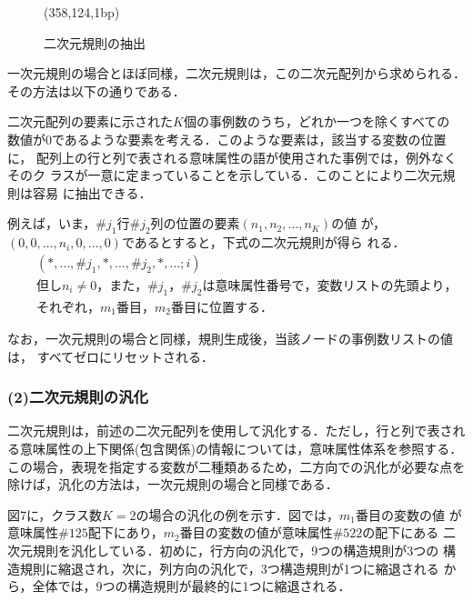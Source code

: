 \begin{figure}[thb]
\begin{center}
\begin{epsf}
\end{epsf}
\begin{draft}
\atari(358,124,1bp)
\end{draft}
\end{center}
\vspace*{-4mm}
\caption{二次元規則の抽出}
\label{fig:二次元規則の抽出}
\end{figure}

一次元規則の場合とほぼ同様，二次元規則は，この二次元配列から求められる．
その方法は以下の通りである．

二次元配列の要素に示された$K$個の事例数のうち，どれか一つを除くすべての
数値が0であるような要素を考える．このような要素は，該当する変数の位置に，
配列上の行と列で表される意味属性の語が使用された事例では，例外なくそのク
ラスが一意に定まっていることを示している．このことにより二次元規則は容易
に抽出できる．

例えば，いま，$\#{j_1}$行$\#{j_2}$列の位置の要素$({n_1,n_2,\dots,n_K})$の値
が，$(0,0,\dots,{n_i},0,\dots,0)$であるとすると，下式の二次元規則が得ら
れる．
\begin{eqnarray}
 &&{(*,\dots,\#j_1,*,\dots,\#j_2,*,\dots;i)}\\
 &&但し{n_i}\neq 0，また，{\#j_1}，{\#j_2}は意味属性番号で，変数リストの先頭より，\nonumber \\
 &&それぞれ，{m_1}番目，{m_2}番目に位置する．\nonumber
\end{eqnarray}

なお，一次元規則の場合と同様，規則生成後，当該ノードの事例数リストの値は，
すべてゼロにリセットされる．
\subsubsection*{(2)二次元規則の汎化}

二次元規則は，前述の二次元配列を使用して汎化する．ただし，行と列で表され
る意味属性の上下関係(包含関係)の情報については，意味属性体系を参照する．
この場合，表現を指定する変数が二種類あるため，二方向での汎化が必要な点を
除けば，汎化の方法は，一次元規則の場合と同様である．

図7に，クラス数$K=2$の場合の汎化の例を示す．図では，${m_1}$番目の変数の値
が意味属性$\#125$配下にあり，${m_2}$番目の変数の値が意味属性$\#522$の配下にある
二次元規則を汎化している．初めに，行方向の汎化で，9つの構造規則が3つの
構造規則に縮退され，次に，列方向の汎化で，3つ構造規則が1つに縮退される
から，全体では，9つの構造規則が最終的に1つに縮退される．

